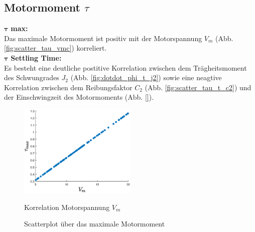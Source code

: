 \subsection*{Motormoment $\tau$}
$\bm{\tau}$ \textbf{max: }\\Das maximale Motormoment ist positiv mit der Motorspannung $V_m$ (Abb. \ref{fig:scatter_tau_vmc}) korreliert.\\

$\bm{\tau}$ \textbf{Settling Time: }\\
Es besteht eine deutliche postitive Korrelation zwischen dem Trägheitsmoment des Schwungrades $J_2$ (Abb. \ref{fig:dotdot_phi_t_j2}) sowie eine neagtive Korrelation zwischen dem Reibungsfaktor $C_2$ (Abb. \ref{fig:scatter_tau_t_c2}) und der Einschwingzeit des Motormoments (Abb. \ref{}).\\
\begin{figure}
    \centering
        \centering
        \includegraphics[width=0.5\textwidth]{Bilder/5_sensi/cm/tau_max_vm.eps}
        \caption{Korrelation Motorspannung $V_m$}
        \label{fig:scatter_tau_vm}
    \caption{Scatterplot über das maximale Motormoment}
\end{figure}
 

